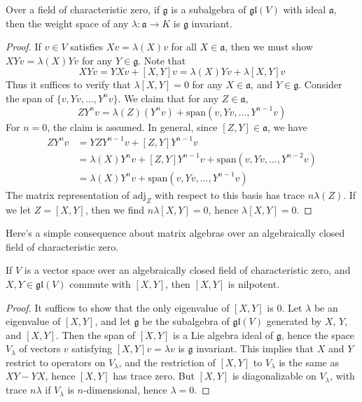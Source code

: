 \begin{theorem}
    Over a field of characteristic zero, if $\mathfrak{g}$ is a subalgebra of $\mathfrak{gl}(V)$ with ideal $\mathfrak{a}$, then the weight space of any $\lambda: \mathfrak{a} \to K$ is $\mathfrak{g}$ invariant.
\end{theorem}
\begin{proof}
    If $v \in V$ satisfies $Xv = \lambda(X)v$ for all $X \in \mathfrak{a}$, then we must show $XYv = \lambda(X)Yv$ for any $Y \in \mathfrak{g}$. Note that
    \[ XYv = YXv + [X,Y]v = \lambda(X) Yv + \lambda[X,Y] v \]
    Thus it suffices to verify that $\lambda[X,Y] = 0$ for any $X \in \mathfrak{a}$, and $Y \in \mathfrak{g}$. Consider the span of $\{ v, Yv, \dots, Y^nv \}$. We claim that for any $Z \in \mathfrak{a}$,
    \[ ZY^n v = \lambda(Z) (Y^n v) + \text{span}(v,Yv, \dots, Y^{n-1}v) \]
    For $n = 0$, the claim is assumed. In general, since $[Z,Y] \in \mathfrak{a}$, we have
    \begin{align*}
        ZY^nv &= YZY^{n-1}v + [Z,Y]Y^{n-1}v\\
        &= \lambda(X) Y^n v + [Z,Y]Y^{n-1}v + \text{span}(v,Yv, \dots, Y^{n-2}v)\\
        &= \lambda(X) Y^n v + \text{span}(v,Yv, \dots, Y^{n-1}v)
    \end{align*}
    The matrix representation of $\text{adj}_Z$ with respect to this basis has trace $n\lambda(Z)$. If we let $Z = [X,Y]$, then we find $n\lambda[X,Y] = 0$, hence $\lambda[X,Y] = 0$.
\end{proof}

Here's a simple consequence about matrix algebras over an algebraically closed field of characteristic zero.

\begin{theorem}
    If $V$ is a vector space over an algebraically closed field of characteristic zero, and $X, Y \in \mathfrak{gl}(V)$ commute with $[X,Y]$, then $[X,Y]$ is nilpotent.
\end{theorem}
\begin{proof}
    It suffices to show that the only eigenvalue of $[X,Y]$ is 0. Let $\lambda$ be an eigenvalue of $[X,Y]$, and let $\mathfrak{g}$ be the subalgebra of $\mathfrak{gl}(V)$ generated by $X$, $Y$, and $[X,Y]$. Then the span of $[X,Y]$ is a Lie algebra ideal of $\mathfrak{g}$, hence the space $V_\lambda$ of vectors $v$ satisfying $[X,Y]v = \lambda v$ is $\mathfrak{g}$ invariant. This implies that $X$ and $Y$ restrict to operators on $V_\lambda$, and the restriction of $[X,Y]$ to $V_\lambda$ is the same as $XY - YX$, hence $[X,Y]$ has trace zero. But $[X,Y]$ is diagonalizable on $V_\lambda$, with trace $n \lambda$ if $V_\lambda$ is $n$-dimensional, hence $\lambda = 0$.
\end{proof}

